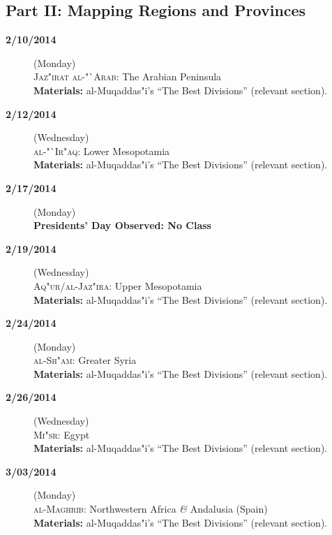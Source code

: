 \documentclass{tufte-handout} %
\def\and{\textit{\&}\xspace}
\begin{document}
\subsection{Part II: Mapping Regions and Provinces}
\begin{description}

\item[\textbf{2/10/2014}] (Monday)\\
\textsc{Jaz"irat al-"`Arab}: The Arabian Peninsula\\
\textbf{Materials:} al-Muqaddas"i's ``The Best Divisions'' (relevant section).

\item[\textbf{2/12/2014}] (Wednesday)\\
\textsc{al-"`Ir"aq}: Lower Mesopotamia\\
\textbf{Materials:} al-Muqaddas"i's ``The Best Divisions'' (relevant section).

\noindent\hrulefill

\item[\textbf{2/17/2014}] (Monday)\\
\textbf{Presidents' Day Observed: No Class}

\item[\textbf{2/19/2014}] (Wednesday)\\
\textsc{Aq"ur/al-Jaz"ira}: Upper Mesopotamia\\
\textbf{Materials:} al-Muqaddas"i's ``The Best Divisions'' (relevant section).

\noindent\hrulefill

\item[\textbf{2/24/2014}] (Monday)\\
\textsc{al-Sh"am:} Greater Syria\\
\textbf{Materials:} al-Muqaddas"i's ``The Best Divisions'' (relevant section).

\item[\textbf{2/26/2014}] (Wednesday)\\
\textsc{Mi"sr}: Egypt\\
\textbf{Materials:} al-Muqaddas"i's ``The Best Divisions'' (relevant section).

\noindent\hrulefill

\item[\textbf{3/03/2014}] (Monday)\\
\textsc{al-Maghrib}: Northwestern Africa \and Andalusia (Spain)\\
\textbf{Materials:} al-Muqaddas"i's ``The Best Divisions'' (relevant section).


\end{description}
\end{document}
